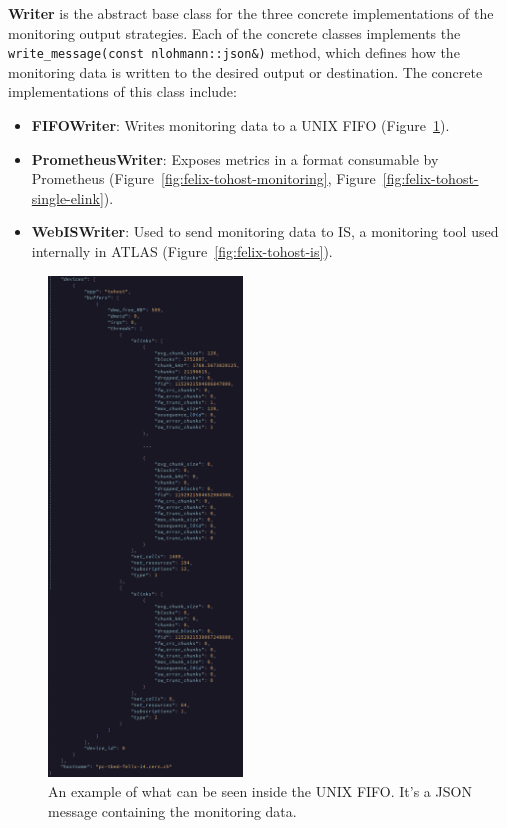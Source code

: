 \textbf{Writer} is the abstract base class for the three concrete implementations of the monitoring output strategies. Each of the concrete classes implements the \texttt{write\_message(const nlohmann::json\&)} method, which defines how the monitoring data is written to the desired output or destination. The concrete implementations of this class include:

\begin{itemize}
    \item \textbf{FIFOWriter}: Writes monitoring data to a UNIX FIFO (Figure~\ref{fig:fifo-monitoring}).
    \item \textbf{PrometheusWriter}: Exposes metrics in a format consumable by Prometheus (Figure~\ref{fig:felix-tohost-monitoring}, Figure~\ref{fig:felix-tohost-single-elink}).
    \item \textbf{WebISWriter}: Used to send monitoring data to \acs{IS}, a monitoring tool used internally in \acs{ATLAS} (Figure~\ref{fig:felix-tohost-is}).
\end{itemize}

\clearpage

\begin{figure}[H]
\centering
\includegraphics[width=0.46\textwidth]{images/results/fifo-monitor.png}
\caption[Monitoring FIFO example]{An example of what can be seen inside the UNIX FIFO. It's a JSON message containing the monitoring data.}
\label{fig:fifo-monitoring}
\end{figure}

